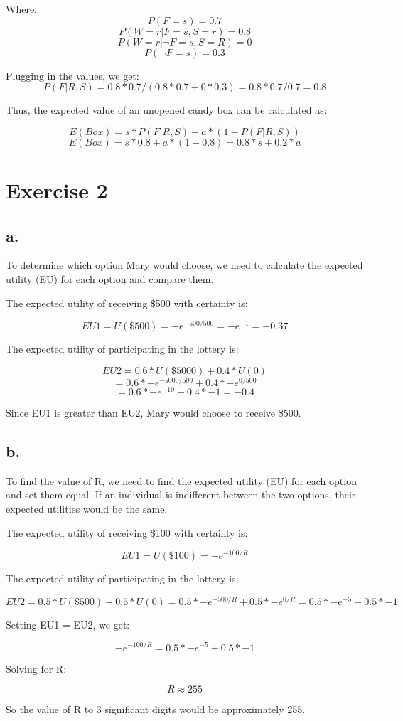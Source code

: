 \documentclass{article}
\begin{document}
Where:
\[P(F = s) = 0.7\]
\[P(W = r|F = s, S = r) = 0.8\]
\[P(W = r|\neg F = s, S = R) = 0\]
\[P(\neg F = s) = 0.3\]

Plugging in the values, we get:
\[P(F|R,S) = 0.8 * 0.7 / (0.8 * 0.7 + 0 * 0.3) = 0.8 * 0.7 / 0.7 = 0.8\]

Thus, the expected value of an unopened candy box can be calculated as:

\[E(Box) = s * P(F|R,S) + a * (1 - P(F|R,S))\]
\[E(Box) = s * 0.8 + a * (1 - 0.8) = 0.8 * s + 0.2 * a\]

\section*{Exercise 2}

\subsection*{a.}

To determine which option Mary would choose, we need to calculate the expected utility (EU) for each option and compare them.

The expected utility of receiving \$500 with certainty is:

\[EU1 = U(\$500) = -e^{-500/500} = -e^{-1} = -0.37\]

The expected utility of participating in the lottery is:

\[EU2 = 0.6 * U(\$5000) + 0.4 * U(0)\]
\[= 0.6 * -e^{-5000/500} + 0.4 * -e^{0/500}\]
\[= 0.6 * -e^{-10} + 0.4 * -1 = -0.4\]

Since EU1 is greater than EU2, Mary would choose to receive \$500.

\subsection*{b.}

To find the value of R, we need to find the expected utility (EU) for each option and set them equal. If an individual is indifferent between the two options, their expected utilities would be the same.

The expected utility of receiving \$100 with certainty is:

\[EU1 = U(\$100) = -e^{-100/R}\]

The expected utility of participating in the lottery is:

\[EU2 = 0.5 * U(\$500) + 0.5 * U(0) = 0.5 * -e^{-500/R} + 0.5 * -e^{0/R} = 0.5 * -e^{-5} + 0.5 * -1\]

Setting EU1 = EU2, we get:

\[-e^{-100/R} = 0.5 * -e^{-5} + 0.5 * -1\]

Solving for R:

\[R \approx 255\]

So the value of R to 3 significant digits would be approximately 255.
\end{document}
